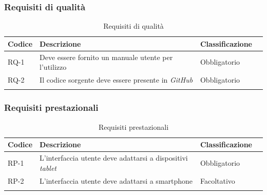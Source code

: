 \subsubsection*{Requisiti di qualità}
\begin{longtable}{>{\centering\arraybackslash}m{}>{\centering\arraybackslash}m{}>{\centering\arraybackslash}m{}>{\centering\arraybackslash}m{}}
    \hline
    \rowcolor{black}
    \color{white}\textbf{Codice} & \color{white}\textbf{Descrizione} & \color{white}\textbf{Classificazione} \\
    \hline
    \endhead %
    RQ-1 & Deve essere fornito un manuale utente per l’utilizzo & Obbligatorio \\
    \hline
    RQ-2 & Il codice sorgente deve essere presente in \textit{GitHub} & Obbligatorio \\
    \hline
    \caption{Requisiti di qualità}
\end{longtable}

\subsubsection*{Requisiti prestazionali}
\begin{longtable}{>{\centering\arraybackslash}m{}>{\centering\arraybackslash}m{}>{\centering\arraybackslash}m{}>{\centering\arraybackslash}m{}}
    \hline
    \rowcolor{black}
    \color{white}\textbf{Codice} & \color{white}\textbf{Descrizione} & \color{white}\textbf{Classificazione} \\
    \hline
    \endhead %
    RP-1 & L’interfaccia utente deve adattarsi a dispositivi \textit{tablet} & Obbligatorio \\
    \hline
    RP-2 & L’interfaccia utente deve adattarsi a smartphone & Facoltativo \\
    \hline
    \caption{Requisiti prestazionali}
\end{longtable}

